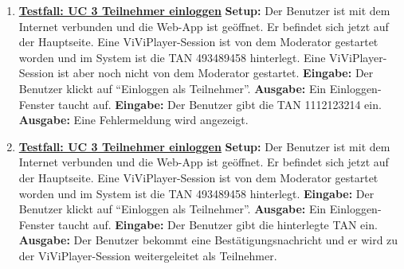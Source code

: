 \begin{enumerate}
	\item \underline{\textbf{Testfall: UC 3 Teilnehmer einloggen}} \linebreak
	\textbf{Setup:} Der Benutzer ist mit dem Internet verbunden und die Web-App ist geöffnet. Er befindet sich jetzt auf der Hauptseite. Eine ViViPlayer-Session ist von dem Moderator gestartet worden und im System ist die TAN 493489458 hinterlegt.
	Eine ViViPlayer-Session ist aber noch nicht von dem Moderator gestartet. \linebreak
	\textbf{Eingabe:} Der Benutzer klickt auf ``Einloggen als Teilnehmer''. \linebreak
	\textbf{Ausgabe:} Ein Einloggen-Fenster taucht auf. \linebreak
	\textbf{Eingabe:} Der Benutzer gibt die TAN 1112123214 ein. \linebreak
	\textbf{Ausgabe:} Eine Fehlermeldung wird angezeigt.
	
	\item \underline{\textbf{Testfall: UC 3 Teilnehmer einloggen}} \linebreak
	\textbf{Setup:} Der Benutzer ist mit dem Internet verbunden und die Web-App ist geöffnet. Er befindet sich jetzt auf der Hauptseite. Eine ViViPlayer-Session ist von dem Moderator gestartet worden und im System ist die TAN 493489458 hinterlegt. \linebreak
	\textbf{Eingabe:} Der Benutzer klickt auf ``Einloggen als Teilnehmer''. \linebreak
	\textbf{Ausgabe:} Ein Einloggen-Fenster taucht auf. \linebreak
	\textbf{Eingabe:} Der Benutzer gibt die hinterlegte TAN ein. \linebreak
	\textbf{Ausgabe:} Der Benutzer bekommt eine Bestätigungsnachricht und er wird zu der ViViPlayer-Session weitergeleitet als Teilnehmer.


\end{enumerate}
